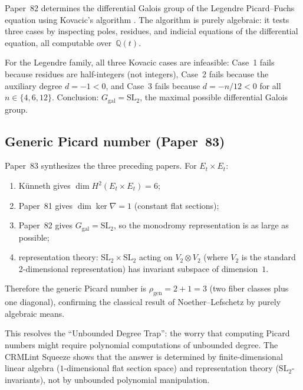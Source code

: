 \documentclass[11pt]{article}
\theoremstyle{plain}
\theoremstyle{definition}
\theoremstyle{remark}
\newcommand{\QQ}{\mathbb{Q}}
\newcommand{\SL}{\mathrm{SL}}
\begin{document}
Paper~82 \cite{p82} determines the differential Galois group of
the Legendre Picard--Fuchs equation using Kovacic's algorithm
\cite{kovacic}.  The algorithm is purely algebraic: it tests three
cases by inspecting poles, residues, and indicial equations of the
differential equation, all computable over~$\QQ(t)$.

For the Legendre family, all three Kovacic cases are infeasible:
Case~1 fails because residues are half-integers (not integers),
Case~2 fails because the auxiliary degree $d = -1 < 0$, and Case~3
fails because $d = -n/12 < 0$ for all $n \in \{4,6,12\}$.
Conclusion: $G_{\mathrm{gal}} = \SL_2$, the maximal possible
differential Galois group.

\subsection{Generic Picard number (Paper~83)}

Paper~83 \cite{p83} synthesizes the three preceding papers.  For
$E_t \times E_t$:
\begin{enumerate}[label=(\roman*)]
\item K\"unneth gives $\dim H^2(E_t \times E_t) = 6$;
\item Paper~81 gives $\dim \ker \nabla = 1$ (constant flat sections);
\item Paper~82 gives $G_{\mathrm{gal}} = \SL_2$, so the monodromy
  representation is as large as possible;
\item representation theory: $\SL_2 \times \SL_2$ acting on
  $V_2 \otimes V_2$ (where $V_2$ is the standard 2-dimensional
  representation) has invariant subspace of dimension~$1$.
\end{enumerate}
Therefore the generic Picard number is
$\rho_{\mathrm{gen}} = 2 + 1 = 3$
(two fiber classes plus one diagonal), confirming the classical
result of Noether--Lefschetz by purely algebraic means.

This resolves the ``Unbounded Degree Trap'': the worry that
computing Picard numbers might require polynomial computations of
unbounded degree.  The CRMLint Squeeze shows that the answer is
determined by finite-dimensional linear algebra ($1$-dimensional
flat section space) and representation theory ($\SL_2$-invariants),
not by unbounded polynomial manipulation.


\end{document}
